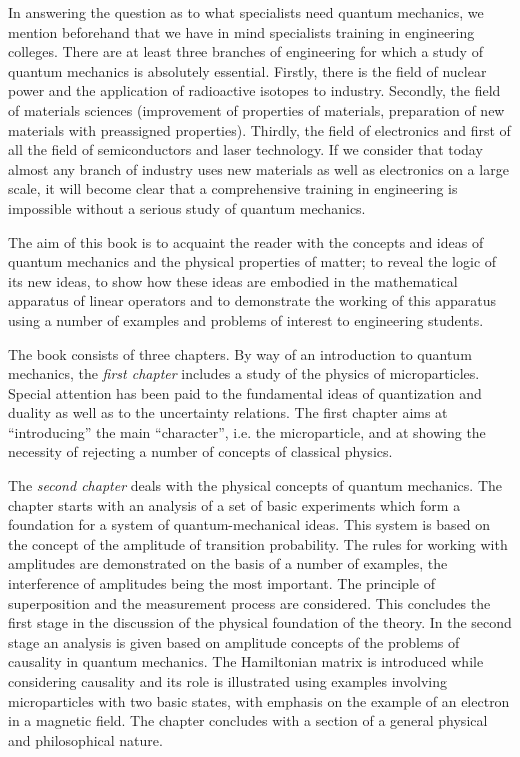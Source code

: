 \documentclass[a4paper,sfsidenotes,colorlinks=true]{tufte-book}
\numberwithin{equation}{section}
\numberwithin{figure}{section}
\begin{document}
In answering the question as to what specialists need quantum mechanics, we mention beforehand that we have in mind specialists training in engineering colleges. There are at least three branches of engineering for which a study of quantum mechanics is absolutely essential. Firstly, there is the field of nuclear power and the application of radioactive isotopes to industry. Secondly, the field of materials sciences (improvement of properties of materials, preparation of new materials with preassigned properties). Thirdly, the field of electronics and first of all the field of semiconductors and laser technology. If we consider that today almost any branch of industry uses new materials as well as electronics on a large scale, it will become clear that a comprehensive training in engineering is impossible without a serious study of quantum mechanics.


The aim of this book is to acquaint the reader with the concepts and ideas of quantum mechanics and the physical properties of matter; to reveal the logic of its new ideas, to show how these ideas are embodied in the mathematical apparatus of linear operators and to demonstrate the working of this apparatus using a number of examples and problems of interest to engineering students.

The book consists of three chapters. By way of an introduction to quantum mechanics, the \emph{first chapter }includes a study of the physics of microparticles. Special attention has been paid to the fundamental ideas of quantization and duality as well as to the uncertainty relations. The first chapter aims at ``introducing'' the main ``character'', i.e. the microparticle, and at showing the necessity of rejecting a number of concepts of classical physics.

The \emph{second chapter} deals with the physical concepts of quantum mechanics. The chapter starts with an analysis of a set of basic experiments which form a foundation for a system of quantum-mechanical ideas. This system is based on the concept of the amplitude of transition probability. The rules for working with amplitudes are demonstrated on the basis of a number of examples, the interference of amplitudes being the most important. The principle of superposition and the measurement process are considered. This concludes the first stage in the discussion of the physical foundation of the theory. In the second stage an analysis is given based on amplitude concepts of the problems of causality in quantum mechanics. The Hamiltonian matrix is introduced while considering causality and its role is illustrated using examples involving microparticles with two basic states, with emphasis on the example of an electron in a magnetic field. The chapter concludes with a section of a general physical and philosophical nature.
\end{document}
